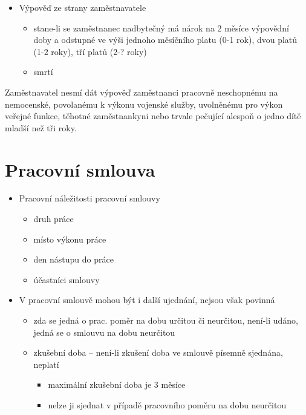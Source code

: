 \begin{enumerate}
\begin{enumerate}
\begin{itemize}
\begin{itemize}
                            \item Výpověď ze strany zaměstnavatele
                                \begin{itemize}
                                    \item stane-li se zaměstnanec nadbytečný má nárok na 2 měsíce výpovědní doby a odstupné ve výši jednoho měsíčního platu (0-1 rok), dvou platů (1-2 roky), tří platů (2-? roky)
                                    \item smrtí
                                \end{itemize}
                        \end{itemize}
                \end{itemize}
        \end{enumerate}
\end{enumerate}

Zaměstnavatel nesmí dát výpověď zaměstnanci pracovně neschopnému na nemocenské, povolanému k výkonu vojenské služby, uvolněnému pro výkon veřejné funkce, těhotné 	zaměstnankyni nebo trvale pečující alespoň o jedno dítě mladší než tři roky.

\section*{Pracovní smlouva}
\begin{itemize}
    \item Pracovní náležitosti pracovní smlouvy
        \begin{itemize}
            \item druh práce
            \item místo výkonu práce
            \item den nástupu do práce
            \item účastníci smlouvy
        \end{itemize}
    \item V pracovní smlouvě mohou být i další ujednání, nejsou však povinná
        \begin{itemize}
            \item zda se jedná o prac. poměr na dobu určitou či neurčitou, není-li udáno, jedná se o smlouvu na dobu neurčitou
            \item zkušební doba -- není-li zkušení doba ve smlouvě písemně sjednána, neplatí
                \begin{itemize}
                    \item maximální zkušební doba je 3 měsíce
                    \item nelze ji sjednat v případě pracovního poměru na dobu neurčitou
                \end{itemize}			
        \end{itemize}
\end{itemize}

